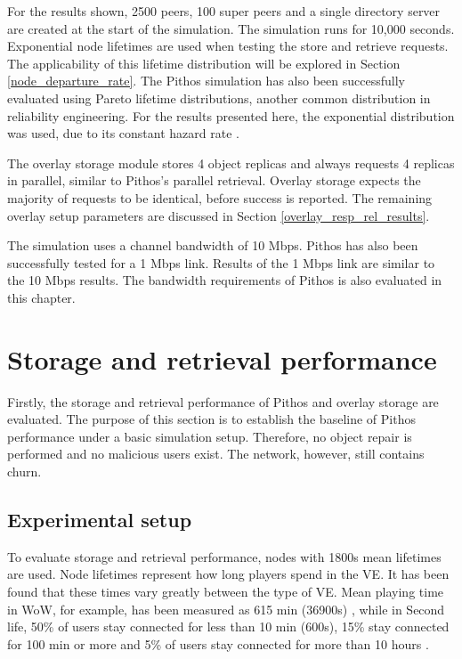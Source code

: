 For the results shown, 2500 peers, 100 super peers and a single directory server are created at the start of the simulation. The simulation runs for 10,000 seconds. Exponential node lifetimes are used when testing the store and retrieve requests. The applicability of this lifetime distribution will be explored in Section \ref{node_departure_rate}. The Pithos simulation has also been successfully evaluated using Pareto lifetime distributions, another common distribution in reliability engineering. For the results presented here, the exponential distribution was used, due to its constant hazard rate \cite{rausand2004systemreliability}.

The overlay storage module stores 4 object replicas and always requests 4 replicas in parallel, similar to Pithos's parallel retrieval. Overlay storage expects the majority of requests to be identical, before success is reported. The remaining overlay setup parameters are discussed in Section \ref{overlay_resp_rel_results}.

The simulation uses a channel bandwidth of 10 Mbps. Pithos has also been successfully tested for a 1 Mbps link. Results of the 1 Mbps link are similar to the 10 Mbps results. The bandwidth requirements of Pithos is also evaluated in this chapter.

\section{Storage and retrieval performance}

Firstly, the storage and retrieval performance of Pithos and overlay storage are evaluated. The purpose of this section is to establish the baseline of Pithos performance under a basic simulation setup. Therefore, no object repair is performed and no malicious users exist. The network, however, still contains churn.

\subsection{Experimental setup}
\label{store_retrieve_exp_setup}

To evaluate storage and retrieval performance, nodes with 1800s mean lifetimes are used. Node lifetimes represent how long players spend in the VE. It has been found that these times vary greatly between the type of VE. Mean playing time in WoW, for example, has been measured as 615 min (36900s) \cite{wow_gameplay}, while in Second life, 50\% of users stay connected for less than 10 min (600s), 15\% stay connected for 100 min or more and 5\% of users stay connected for more than 10 hours \cite{Varvello_life_in_second_life}.

